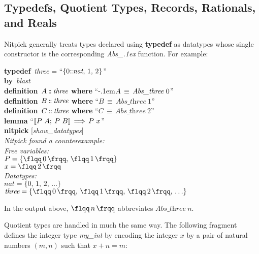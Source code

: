 \documentclass[a4paper,12pt]{article}
\def\Colon{\mathord{:\mkern-1.5mu:}}
\def\unr{\ldots}
\def\Abs#1{\hbox{\rm{\flqq}}{\,#1\,}\hbox{\rm{\frqq}}}
\begin{document}
\subsection{Typedefs, Quotient Types, Records, Rationals, and Reals}
\label{typedefs-quotient-types-records-rationals-and-reals}

Nitpick generally treats types declared using \textbf{typedef} as datatypes
whose single constructor is the corresponding \textit{Abs\_\kern.1ex} function.
For example:

\prew
\textbf{typedef}~\textit{three} = ``$\{0\Colon\textit{nat},\, 1,\, 2\}$'' \\
\textbf{by}~\textit{blast} \\[2\smallskipamount]
\textbf{definition}~$A \mathbin{\Colon} \textit{three}$ \textbf{where} ``\kern-.1em$A \,\equiv\, \textit{Abs\_\allowbreak three}~0$'' \\
\textbf{definition}~$B \mathbin{\Colon} \textit{three}$ \textbf{where} ``$B \,\equiv\, \textit{Abs\_three}~1$'' \\
\textbf{definition}~$C \mathbin{\Colon} \textit{three}$ \textbf{where} ``$C \,\equiv\, \textit{Abs\_three}~2$'' \\[2\smallskipamount]
\textbf{lemma} ``$\mathopen{[\![} P~A;\> P~B\mathclose{]\!]} \,\Longrightarrow\, P~x$'' \\
\textbf{nitpick} [\textit{show\_datatypes}] \\[2\smallskipamount]
\slshape Nitpick found a counterexample: \\[2\smallskipamount]
\hbox{}\qquad Free variables: \nopagebreak \\
\hbox{}\qquad\qquad $P = \{\Abs{0},\, \Abs{1}\}$ \\
\hbox{}\qquad\qquad $x = \Abs{2}$ \\
\hbox{}\qquad Datatypes: \\
\hbox{}\qquad\qquad $\textit{nat} = \{0,\, 1,\, 2,\, \unr\}$ \\
\hbox{}\qquad\qquad $\textit{three} = \{\Abs{0},\, \Abs{1},\, \Abs{2},\, \unr\}$
\postw

In the output above, $\Abs{n}$ abbreviates $\textit{Abs\_three}~n$.

Quotient types are handled in much the same way. The following fragment defines
the integer type \textit{my\_int} by encoding the integer $x$ by a pair of
natural numbers $(m, n)$ such that $x + n = m$:
\end{document}
